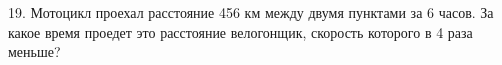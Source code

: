 19. Мотоцикл проехал расстояние 456 км между двумя пунктами за 6 часов. За какое время проедет это расстояние велогонщик, скорость которого в 4 раза меньше?\\
